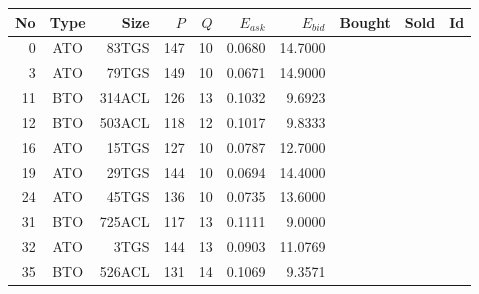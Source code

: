\begin{tabular}{|r|c|r|r|r|r|r|p{2cm}|p{2cm}|r|}
\hline

No & Type & Size & $P$ & $Q$ & $E_{ask}$ & $E_{bid}$ & Bought & Sold & Id \\
\hline
0 & ATO & 83TGS & 147 & 10 & 0.0680 & 14.7000 &    &    &    \\
\hline
3 & ATO & 79TGS & 149 & 10 & 0.0671 & 14.9000 &    &    &    \\
\hline
11 & BTO & 314ACL & 126 & 13 & 0.1032 & 9.6923 &    &    &    \\
\hline
12 & BTO & 503ACL & 118 & 12 & 0.1017 & 9.8333 &    &    &    \\
\hline
16 & ATO & 15TGS & 127 & 10 & 0.0787 & 12.7000 &    &    &    \\
\hline
19 & ATO & 29TGS & 144 & 10 & 0.0694 & 14.4000 &    &    &    \\
\hline
24 & ATO & 45TGS & 136 & 10 & 0.0735 & 13.6000 &    &    &    \\
\hline
31 & BTO & 725ACL & 117 & 13 & 0.1111 & 9.0000 &    &    &    \\
\hline
32 & ATO & 3TGS & 144 & 13 & 0.0903 & 11.0769 &    &    &    \\
\hline
35 & BTO & 526ACL & 131 & 14 & 0.1069 & 9.3571 &    &    &    \\
\hline
\end{tabular}
